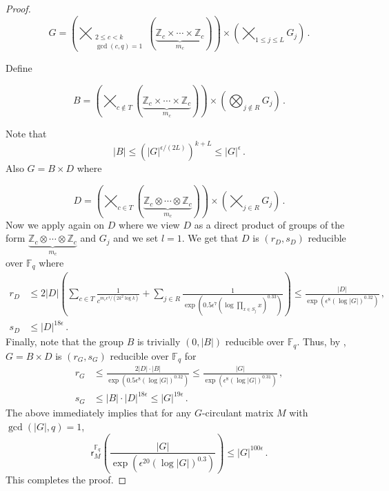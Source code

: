 \documentclass{toc}
\newcommand\F{{\mathbb{F}}}
\renewcommand\Z{{\mathbb{Z}}}
\newcommand{\eps}{\epsilon}
\begin{document}
\begin{proof}
\[
G = \left( \bigtimes_{\substack{2 \leq c < k \\ \gcd(c,q) = 1}} \left( \underbrace{\Z_c \times \cdots \times \Z_c}_{\text{$m_c$}}\right) \right) \times \left(\bigtimes_{1 \leq j \leq L} G_j \right) \,.
\]

Define 

\[B = \left( \bigtimes_{c \notin T} \left( \underbrace{\Z_c \times \cdots \times \Z_c}_{\text{$m_c$}}\right) \right) \times \left(\bigotimes_{j \notin R} G_j \right) \,. \]

Note that 
\[
|B| \leq \left( |G|^{\epsilon/(2L)}\right)^{k + L} \leq |G|^{\epsilon} \,.
\]
Also $G = B \times D$ where

\[
D =  \left( \bigtimes_{c \in T} \left( \underbrace{\Z_c \otimes \cdots \otimes \Z_c}_{\text{$m_c$}}\right) \right) \times \left(\bigtimes_{j \in R} G_j \right) \,.
\]
Now we apply  again on $D$ where we view $D$ as a direct product of groups of the form $\underbrace{\Z_c \otimes \cdots \otimes \Z_c}_{\text{$m_c$}}$ and $G_j$ and we set $l = 1$.  We get that $D$ is $(r_D,s_D)$ reducible over $\F_q$ where
\begin{align*}
r_D &\leq 2|D|\left( \sum_{c \in T}\frac{1}{c^{m_c\epsilon^4/(2k^2 \log k)}} + \sum_{j \in R}\frac{1}{\exp\left(0.5\epsilon^7 (\log \prod_{x \in S_j}x )^{0.33}\right)} \right)  \leq \frac{|D|}{\exp\left(\epsilon^8 (\log |G|)^{0.32}\right)}\,, \\
s_D &\leq |D|^{18\eps} \,.
\end{align*}
Finally, note that the group $B$ is trivially $(0, |B|)$ reducible over $\F_q$.  Thus, by , $G = B \times D$ is $(r_G,s_G)$ reducible over $\F_q$ for
\begin{align*}
r_G &\leq \frac{2|D| \cdot |B| }{\exp\left(0.5\epsilon^8 (\log |G|)^{0.32}\right)} \leq \frac{|G|}{\exp\left(\epsilon^{8}(\log |G|)^{0.31}\right)}\,, \\
s_G &\leq |B| \cdot |D|^{18\eps} \leq |G|^{19\eps} \,.
\end{align*}
The above immediately implies that for any $G$-circulant matrix $M$ with $\gcd(|G|,q) = 1$,
\[
\textsf{r}_M^{\F_q}\left( \frac{|G|}{\exp\left(\epsilon^{20}(\log |G|)^{0.3}\right)}\right) \leq |G|^{100 \epsilon} \,.
\]
This completes the proof. 

\end{proof}
\end{document}
